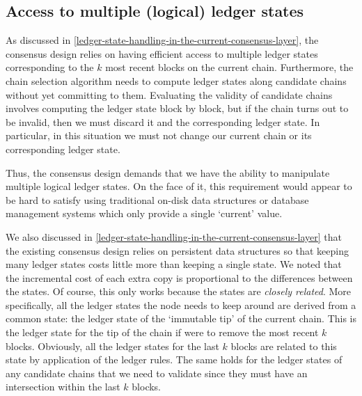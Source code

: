 \documentclass[11pt,a4paper]{article}
\begin{document}
\subsection{Access to multiple (logical) ledger states}
\label{access-to-multiple-logical-ledger-states}

As discussed in \cref{ledger-state-handling-in-the-current-consensus-layer},
the consensus design relies on having efficient access to multiple ledger
states corresponding to the $k$ most recent blocks on the current chain.
Furthermore, the chain selection algorithm needs to compute ledger states along
candidate chains without yet committing to them. Evaluating the validity of
candidate chains involves computing the ledger state block by block, but if
the chain turns out to be invalid, then we must discard it and the corresponding
ledger state. In particular, in this situation we must not change our current
chain or its corresponding ledger state.

Thus, the consensus design demands that we have the ability to manipulate
multiple logical ledger states. On the face of it, this requirement would appear
to be hard to satisfy using traditional on-disk data structures or database
management systems which only provide a single `current' value.

We also discussed in \cref{ledger-state-handling-in-the-current-consensus-layer}
that the existing consensus design relies on persistent data structures so that
keeping many ledger states costs little more than keeping a single state. We noted that
the incremental cost of each extra copy is proportional to the differences
between the states. Of course, this only works because the states are
\emph{closely related}. More specifically, all the ledger states the node needs
to keep around are derived from a common state: the ledger state of the `immutable
tip' of the current chain. This is the ledger state for the tip of the chain if
were to remove the most recent $k$ blocks. Obviously, all the ledger states for
the last $k$ blocks are related to this state by application of the ledger
rules. The same holds for the ledger states of any candidate chains that we
need to validate since they must have an intersection within the last $k$
blocks.
\end{document}
